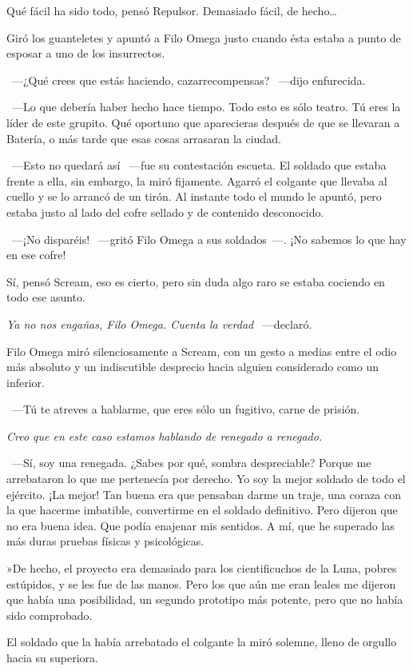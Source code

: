 Qué fácil ha sido todo, pensó Repulsor. Demasiado fácil, de hecho\dots

Giró los guanteletes y apuntó a Filo Omega justo cuando ésta estaba a punto de esposar a uno de los insurrectos.

~---¿Qué crees que estás haciendo, cazarrecompensas? ~---dijo enfurecida.

~---Lo que debería haber hecho hace tiempo. Todo esto es sólo teatro. Tú eres la líder de este grupito. Qué oportuno que aparecieras después de que se llevaran a Batería, o más tarde que esas cosas arrasaran la ciudad.

~---Esto no quedará así ~---fue su contestación escueta. El soldado que estaba frente a ella, sin embargo, la miró fijamente. Agarró el colgante que llevaba al cuello y se lo arrancó de un tirón. Al instante todo el mundo le apuntó, pero estaba justo al lado del cofre sellado y de contenido desconocido.

~---¡No disparéis! ~---gritó Filo Omega a sus soldados~---. ¡No sabemos lo que hay en ese cofre!

Sí, pensó Scream, eso es cierto, pero sin duda algo raro se estaba cociendo en todo ese asunto.

\emph{Ya no nos engañas, Filo Omega. Cuenta la verdad} ~---declaró.

Filo Omega miró silenciosamente a Scream, con un gesto a medias entre el odio más absoluto y un indiscutible desprecio hacia alguien considerado como un inferior.

~---Tú te atreves a hablarme, que eres sólo un fugitivo, carne de prisión.

\emph{Creo que en este caso estamos hablando de renegado a renegado.}

~---Sí, soy una renegada. ¿Sabes por qué, sombra despreciable? Porque me arrebataron lo que me pertenecía por derecho. Yo soy la mejor soldado de todo el ejército. ¡La mejor! Tan buena era que pensaban darme un traje, una coraza con la que hacerme imbatible, convertirme en el soldado definitivo. Pero dijeron que no era buena idea. Que podía enajenar mis sentidos. A mí, que he superado las más duras pruebas físicas y psicológicas.

»De hecho, el proyecto era demasiado para los cientificuchos de la Luna, pobres estúpidos, y se les fue de las manos. Pero los que aún me eran leales me dijeron que había una posibilidad, un segundo prototipo más potente, pero que no había sido comprobado.

El soldado que la había arrebatado el colgante la miró solemne, lleno de orgullo hacia su superiora.

